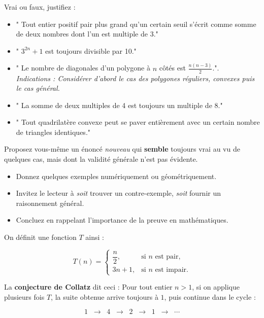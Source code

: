 \begin{exercise}
    Vrai ou faux, justifiez : \\

    \begin{itemize}
      \item " Tout entier positif pair plus grand qu’un certain seuil s’écrit comme somme de deux nombres dont l’un est multiple de 3."
      \item " $3^{2n} + 1$ est toujours divisible par 10."
      \item " Le nombre de diagonales d'un polygone à $n$ côtés est  $\displaystyle\frac{n(n-3)}{2}$.". \\
      \emph{Indications : Considérer d'abord le cas des polygones réguliers, convexes puis le cas général.}
      \item " La somme de deux multiples de 4 est toujours un multiple de 8."
      \item " Tout quadrilatère convexe peut se paver entièrement avec un certain nombre de triangles identiques."
          \end{itemize}
\end{exercise}

\begin{exercise}
Proposez vous-même un énoncé \emph{nouveau} qui \textbf{semble} toujours vrai au vu de quelques cas, mais dont la validité générale n’est pas évidente.
\begin{itemize}
  \item Donnez quelques exemples numériquement ou géométriquement.
  \item Invitez le lecteur à \emph{soit} trouver un contre-exemple, \emph{soit} fournir un raisonnement général.
  \item Concluez en rappelant l’importance de la preuve en mathématiques.
\end{itemize}
\end{exercise}

\begin{exercise}
On définit une fonction $T$ ainsi :

\[
T(n) =
\begin{cases}
\dfrac{n}{2}, & \text{si $n$ est pair}, \\[6pt]
3n + 1, & \text{si $n$ est impair}.
\end{cases}
\]

La \textbf{conjecture de Collatz} dit ceci :
Pour tout entier $n > 1$, si on applique plusieurs fois $T$,
la suite obtenue arrive toujours à $1$, puis continue dans le cycle :

\[
1 \;\;\to\;\; 4 \;\;\to\;\; 2 \;\;\to\;\; 1 \;\;\to\;\; \cdots
\]

\end{exercise}























